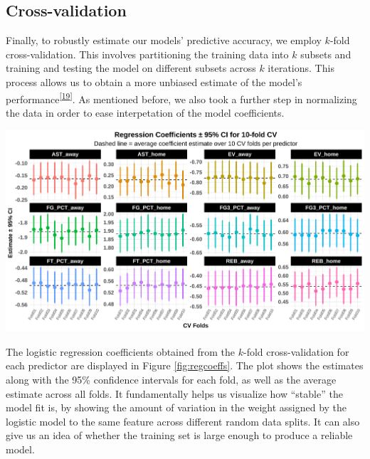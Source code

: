 \documentclass[
  12pt,
  a4paper,
]{article}
\let\origfigure\figure
\let\endorigfigure\endfigure
\renewenvironment{figure}[1][2] {
    \expandafter\origfigure\expandafter[H]
} {
    \endorigfigure
}
\begin{document}
\hypertarget{cross-validation}{%
\subsection{Cross-validation}\label{cross-validation}}

Finally, to robustly estimate our models' predictive accuracy, we employ \(k\)-fold cross-validation. This involves partitioning the training data into \(k\) subsets and training and testing the model on different subsets across \(k\) iterations. This process allows us to obtain a more unbiased estimate of the model's performance\textsuperscript{{[}\protect\hyperlink{ref-hastie-elements}{19}{]}}. As mentioned before, we also took a further step in normalizing the data in order to ease interpetation of the model coefficients.

\begin{figure}

{\centering \includegraphics[width=1\linewidth]{latex/plots/plot_11} 

}

\caption{Regression coefficients plot for 10-fold full model cross-validation}\label{fig:regcoeffs}
\end{figure}

The logistic regression coefficients obtained from the \(k\)-fold cross-validation for each predictor are displayed in Figure \ref{fig:regcoeffs}. The plot shows the estimates along with the 95\% confidence intervals for each fold, as well as the average estimate across all folds. It fundamentally helps us visualize how ``stable'' the model fit is, by showing the amount of variation in the weight assigned by the logistic model to the same feature across different random data splits. It can also give us an idea of whether the training set is large enough to produce a reliable model.
\end{document}
